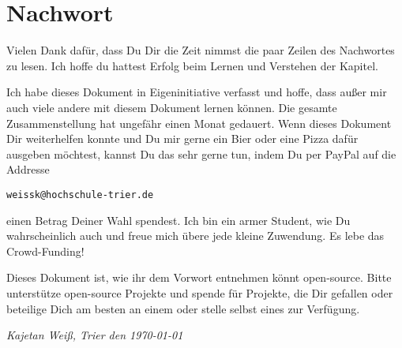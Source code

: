 \chapter{Nachwort}
Vielen Dank dafür, dass Du Dir die Zeit nimmst die paar Zeilen des Nachwortes zu lesen. Ich hoffe du hattest Erfolg beim Lernen und Verstehen der Kapitel.

Ich habe dieses Dokument in Eigeninitiative verfasst und hoffe, dass außer mir auch viele andere mit diesem Dokument lernen können. Die gesamte Zusammenstellung hat ungefähr einen Monat gedauert. Wenn dieses Dokument Dir weiterhelfen konnte und Du mir gerne ein Bier oder eine Pizza dafür ausgeben möchtest, kannst Du das sehr gerne tun, indem Du per PayPal auf die Addresse
\begin{center}
	\texttt{weissk@hochschule-trier.de}
\end{center}
einen Betrag Deiner Wahl spendest. Ich bin ein armer Student, wie Du wahrscheinlich auch und freue mich übere jede kleine Zuwendung. Es lebe das Crowd-Funding! \smiley  

Dieses Dokument ist, wie ihr dem Vorwort entnehmen könnt open-source. Bitte unterstütze open-source Projekte und spende für Projekte, die Dir gefallen oder beteilige Dich  am besten an einem oder stelle selbst eines zur Verfügung.

\vspace{2cm}

\textsl{Kajetan Weiß, Trier den \today}